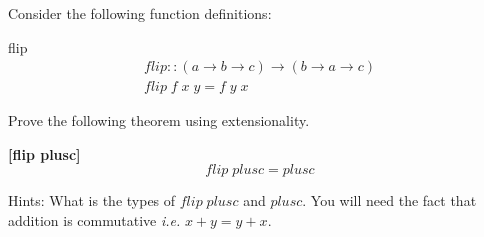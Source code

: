 \documentclass[11pt]{article}
\begin{document}
\begin{problem}

Consider the following function definitions: 

\begin{definition}{flip}
\[\begin{array}{l}
flip :: (a \rightarrow b \rightarrow c) \rightarrow (b \rightarrow a \rightarrow c) \\
flip  \;f\; x\; y = f\; y\; x 
\end{array}\]
\end{definition}

Prove the following theorem using extensionality.

\begin{theorem}{\bf{[flip plusc]}} 
\[flip\;plusc = plusc \]
\end{theorem}

Hints: What is the types of $flip\;plusc$ and $plusc$. You will need the fact
that addition is commutative {\em{i.e.}}  $x + y = y + x$.


\end{problem}






\end{document}
